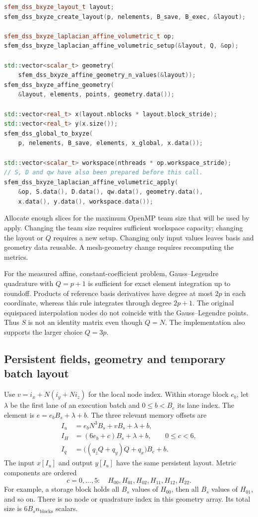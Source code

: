 \documentclass[11pt]{article}
\begin{document}
\begin{lstlisting}[language=C++]
sfem_dss_bxyze_layout_t layout;
sfem_dss_bxyze_create_layout(p, nelements, B_save, B_exec, &layout);

sfem_dss_bxyze_laplacian_affine_volumetric_t op;
sfem_dss_bxyze_laplacian_affine_volumetric_setup(&layout, Q, &op);

std::vector<scalar_t> geometry(
    sfem_dss_bxyze_affine_geometry_n_values(&layout));
sfem_dss_bxyze_affine_geometry(
    &layout, elements, points, geometry.data());

std::vector<real_t> x(layout.nblocks * layout.block_stride);
std::vector<real_t> y(x.size());
sfem_dss_global_to_bxyze(
    p, nelements, B_save, elements, x_global, x.data());

std::vector<scalar_t> workspace(nthreads * op.workspace_stride);
// S, D and qw have also been prepared before this call.
sfem_dss_bxyze_laplacian_affine_volumetric_apply(
    &op, S.data(), D.data(), qw.data(), geometry.data(),
    x.data(), y.data(), workspace.data());
\end{lstlisting}
Allocate enough slices for the maximum OpenMP team size that will be used by
apply. Changing the team size requires sufficient workspace capacity; changing
the layout or \(Q\) requires a new setup. Changing only input values leaves
basis and geometry data reusable. A mesh-geometry change requires recomputing
the metrics.

For the measured affine, constant-coefficient problem, Gauss--Legendre
quadrature with \(Q=p+1\) is sufficient for exact element integration up to
roundoff. Products of reference basis derivatives have degree at most \(2p\)
in each coordinate, whereas this rule integrates through degree \(2p+1\).
The original equispaced interpolation nodes do not coincide with the
Gauss--Legendre points. Thus \(S\) is not an identity matrix even though
\(Q=N\). The implementation also supports the larger choice \(Q=3p\).

\subsection{Persistent fields, geometry and temporary batch layout}

Use \(v=i_x+N(i_y+Ni_z)\) for the local node index. Within storage block
\(e_b\), let \(\lambda\) be the first lane of an execution batch and
\(0\le b<B_e\) its lane index. The element is \(e=e_bB_s+\lambda+b\).
The three relevant memory offsets are
\[
\begin{aligned}
 I_u&=e_bN^3B_s+vB_s+\lambda+b,\\
 I_H&=(6e_b+c)B_s+\lambda+b,\qquad 0\le c<6,\\
 I_q&=\bigl((q_zQ+q_y)Q+q_x\bigr)B_e+b.
\end{aligned}
\]
The input \(x[I_u]\) and output \(y[I_u]\) have the same persistent layout.
Metric components are ordered
\[
 c=0,\ldots,5:
 \quad H_{00},H_{01},H_{02},H_{11},H_{12},H_{22}.
\]
For example, a storage block holds all \(B_s\) values of \(H_{00}\), then all
\(B_s\) values of \(H_{01}\), and so on. There is no node or quadrature index
in this geometry array. Its total size is \(6B_sn_{\mathrm{blocks}}\) scalars.
\end{document}
